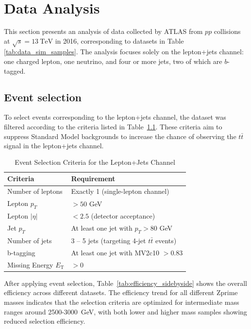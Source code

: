 \chapter{Data Analysis}

    This section presents an analysis of data collected by \textsc{ATLAS} from $pp$ collisions at $\sqrt{s} = 13~\mathrm{TeV}$ in 2016, corresponding to datasets in Table \ref{tab:data_sim_samples}. The analysis focuses solely on the lepton+jets channel: one charged lepton, one neutrino, and four or more jets, two of which are $b$-tagged.


    \section{Event selection}
To select events corresponding to the lepton+jets channel, the dataset was filtered according to the criteria listed in Table~\ref{tab:cut}. These criteria aim to suppress Standard Model backgrounds to increase the chance of observing the \( t\bar{t} \) signal in the lepton+jets channel.


\begin{table}[h!]
\centering
\caption{Event Selection Criteria for the Lepton+Jets Channel}
\begin{tabular}{@{}lp{7cm}@{}}
\toprule
\textbf{Criteria} & \textbf{Requirement} \\ \midrule
Number of leptons & Exactly 1 (single-lepton channel) \\
Lepton \(p_T\) & \(> 50\) GeV  \\
Lepton \(|\eta|\) & \(< 2.5\) (detector acceptance) \\
Jet \(p_T\) & At least one jet with \(p_T > 80\) GeV \\
Number of jets & 3 -- 5 jets (targeting 4-jet \(t\bar{t}\) events) \\
b-tagging & At least one jet with MV2c10 \(> 0.83\) \\
Missing Energy $E_{\mathrm{T}}$ & $> 0$ \\
\bottomrule
\end{tabular}
\label{tab:cut}
\end{table}

After applying event selection, Table~\ref{tab:efficiency_sidebyside} shows the overall efficiency across different datasets. The efficiency trend for all different Zprime masses indicates that the selection criteria are optimized for intermediate mass ranges around 2500-3000~GeV, with both lower and higher mass samples showing reduced selection efficiency.
\\

